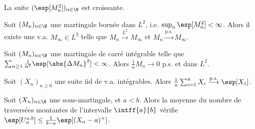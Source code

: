 \begin{rem}
	La suite $(\esp[M_n^2])_{n \in \N}$ est croissante.
\end{rem}

\begin{thm}
	Soit $(M_n)_{n \in \N}$ une martingale bornée dans $L^2$, i.e. $\sup_n \esp[M_n^2] < \infty$.
	Alors il existe une v.a. $M_\infty \in L^2$ telle que $M_n \overset{L^2}{\longrightarrow} M_\infty$ et $M_n \overset{\text{p.s.}}{\longrightarrow} M_\infty$.
\end{thm}

\begin{thm}
	Soit $(M_n)_{n \in \N}$ une martingale de carré intégrable telle que $\sum_{n \geq 1} \frac{1}{n^2} \esp[\abs{\Delta M_n}^2] < \infty$.
	Alors $\frac{1}{n} M_n \longrightarrow 0$ p.s. et dans $L^2$.
\end{thm}

\begin{thm}
	Soit $(X_n)_{n \geq 0}$ une suite iid de v.a. intégrables.
	Alors $\frac{1}{n} \sum_{i = 1}^n X_i \overset{\text{p.s.}}{\longrightarrow} \esp[X_1]$.
\end{thm}

\begin{lem}
	Soit $(X_n)_{n \in \N}$ une sous-martingale, et $a < b$.
	Alors la moyenne du nombre de traversées montantes de l'intervalle $\intff{a}{b}$ vérifie $\esp[U_n^{a,b}] \leq \frac{1}{b - a} \esp[(X_n - a)^+]$.
\end{lem}
